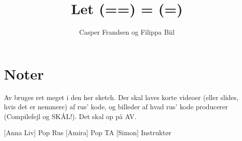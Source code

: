 \documentclass{article}
\title{Let (==) = (=)}                   %
\author{Casper Frandsen og Filippa Biil}  %
\begin{document}
                
\maketitle
\section*{Noter}   
Av bruges ret meget i den her sketch. Der skal laves korte videoer (eller slides, hvis det er nemmere) af rus' kode, og billeder af hvad rus' kode producerer (Compilefejl og SKÅL!). Det skal op på AV. 

\begin{roles}
[Anna Liv] Pop Rus
[Amira] Pop TA
[Simon] Instruktør
\end{roles}

\begin{props}
    
\end{props}
\end{document}
